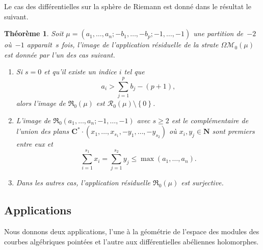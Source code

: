 \documentclass[11pt]{article}
\numberwithin{equation}{section}\renewcommand{\proofname}{Démonstration}
\let\mathcal\mathscr
\newenvironment{enumeratei}
{\bgroup\def\theenumi{\roman{enumi}}\def\theenumii{\arabic{enumii}}\begin{enumerate}}
{\end{enumerate}\egroup}
\newcommand{\CC}{\mathbf{C}}
\newcommand{\NN}{\mathbf{N}}
\newcommand{\appres}[1][g]{\mathfrak{R}_{#1}}
\newcommand{\espres}[1][g]{\mathcal{R}_{#1}}
\newcommand{\omoduli}[1][g]{{\Omega\mathcal M}_{\!#1}}
\newtheorem{thm}{Théorème}[section]
\theoremstyle{definition}
\begin{document}
Le cas des différentielles sur la sphère de Riemann est donné dans le résultat le suivant.
\begin{thm}\label{thm:geq0keq1}
Soit $\mu=(a_{1},\dots,a_{n};-b_{1},\dots,-b_{p};-1,\dots,-1)$ une partition de~$-2$ où~$-1$ apparaît~$s$ fois, l'image de l'application résiduelle de la strate $\omoduli[0](\mu)$ est donnée par l'un des cas suivant.
\begin{enumeratei}
\item\label{thm:geq0keq1i} Si $s=0$ et qu'il existe un indice $i$ tel que
\begin{equation}\label{eq:genrezeroresiduzerofr}
a_{i}>\sum_{j=1}^{p}b_{j}-(p+1),
\end{equation}
alors l'image de $\appres[0](\mu)$ est $\espres[0](\mu)\setminus\left\{0\right\}$.
\item\label{thm:geq0keq1ii} L'image de $\appres[0](a_{1},\dots,a_{n};-1,\dots,-1)$ avec $s\geq2$ est le complémentaire de l'union des plans $\CC^{\ast} \cdot (x_{1},\dots,x_{s_{1}},-y_{1},\dots,-y_{s_{2}})$ où $x_{i},y_{j} \in \NN$ sont premiers entre eux et
\begin{equation}\label{eq:polessimples}
\sum_{i=1}^{s_{1}} x_{i} = \sum_{j=1}^{s_{2}} y_{j} \leq \max(a_{1},\dots,a_{n}).
\end{equation}
\item\label{thm:geq0keq1iii} Dans les autres cas, l'application résiduelle $\appres[0](\mu)$ est surjective.
\end{enumeratei}
\end{thm}

\subsection{Applications}
\label{sec:apliintro}

Nous donnons deux applications, l'une à la géométrie de l'espace des modules des courbes algébriques pointées et l'autre aux différentielles abéliennes holomorphes.
\end{document}

